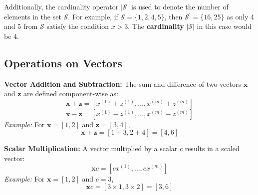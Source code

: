 Additionally, the cardinality operator \( |\mathcal{S}| \) is used to denote the number of elements in the set \( \mathcal{S} \). For example, if \( \mathcal{S} = \{1, 2, 4, 5\} \), then \( \mathcal{S}^{\prime} = \{16, 25\} \) as only 4 and 5 from \( \mathcal{S} \) satisfy the condition \( x > 3 \). The \textbf{cardinality} \( |\mathcal{S}| \) in this case would be 4.

\subsection{Operations on Vectors}

\textbf{Vector Addition and Subtraction:}
The sum and difference of two vectors \( \mathbf{x} \) and \( \mathbf{z} \) are defined component-wise as:
\[ \mathbf{x} + \mathbf{z} = \left[x^{(1)} + z^{(1)}, \ldots, x^{(m)} + z^{(m)}\right] \]
\[ \mathbf{x} - \mathbf{z} = \left[x^{(1)} - z^{(1)}, \ldots, x^{(m)} - z^{(m)}\right] \]
\emph{Example:} For \( \mathbf{x} = [1, 2] \) and \( \mathbf{z} = [3, 4] \),
\[ \mathbf{x} + \mathbf{z} = [1+3, 2+4] = [4, 6] \]

\textbf{Scalar Multiplication:}
A vector multiplied by a scalar \( c \) results in a scaled vector:
\[ \mathbf{x} c = \left[c x^{(1)}, \ldots, c x^{(m)}\right] \]
\emph{Example:} For \( \mathbf{x} = [1, 2] \) and \( c = 3 \),
\[ \mathbf{x} c = [3 \times 1, 3 \times 2] = [3, 6] \]

